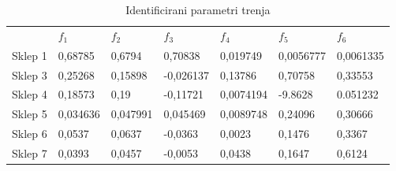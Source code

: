 \begin{table}[]
\centering
\label{table:friction_params}
\begin{tabular}{|l||l|l|l|l|l|l|}
\cline{2-7}
\hhline{~------}
\multicolumn{1}{c|}{}  & $ f_1 $ & $ f_2 $ & $ f_3 $ & $ f_4 $ & $ f_5 $ & $ f_6 $ \\ \hhline{-======}
Sklep 1 & 0,68785 & 0,6794 & 0,70838 & 0,019749 & 0,0056777 & 0,0061335 \\ \hline
Sklep 3 & 0,25268 & 0,15898 & -0,026137 & 0,13786 & 0,70758 & 0,33553 \\ \hline
Sklep 4 & 0,18573 & 0,19 & -0,11721 & 0,0074194 & -9.8628  & 0.051232 \\ \hline
Sklep 5 & 0,034636 & 0,047991 & 0,045469 & 0,0089748 & 0,24096 & 0,30666 \\ \hline
Sklep 6 & 0,0537 & 0,0637 & -0,0363 & 0,0023 & 0,1476 & 0,3367 \\ \hline
Sklep 7 & 0,0393 & 0,0457 & -0,0053 & 0,0438 & 0,1647 & 0,6124 \\ \hline
\end{tabular}
\caption{Identificirani parametri trenja}
\end{table}